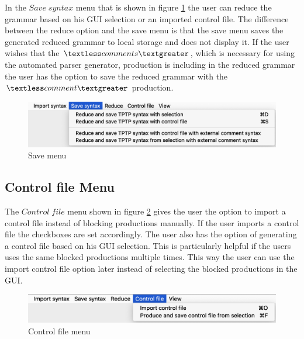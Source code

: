In the $Save\;syntax$ menu that is shown in figure \ref{fig:save} the user can reduce the grammar based on his GUI selection or an imported control file. The difference between the reduce option and the save menu is that the save menu saves the generated reduced grammar to local storage and does not display it. If the user wishes that the $\textless comments\textgreater$, which is necessary for using the automated parser generator, production is including in the reduced grammar the user has the option to save the reduced grammar with the $\textless comment\textgreater$ production.

\begin{figure}[H]
\centering
\includegraphics[width=.7\textwidth]{images/save.png}
\caption{Save menu}
\label{fig:save}
\end{figure}

\subsection{Control file Menu}\label{sec:ConceptGUIControlFileMenu}

The $Control\;file$ menu shown in figure \ref{fig:ControlFileMenu} gives the user the option to import a control file instead of blocking productions manually. If the user imports a control file the checkboxes are set accordingly.
The user also has the option of generating a control file based on his GUI selection. This is particularly helpful if the users uses the same blocked productions multiple times. This way the user can use the import control file option later instead of selecting the blocked productions in the GUI.

\begin{figure}[H]
\centering
\includegraphics[width=.7\textwidth]{images/control_file_menu.png}
\caption{Control file menu}
\label{fig:ControlFileMenu}
\end{figure}


